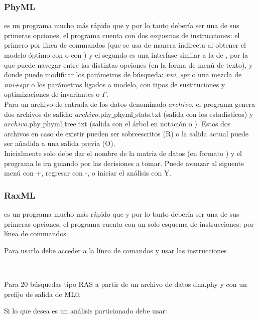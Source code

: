 \subsubsection{PhyML}
 es un programa mucho m\'as r\'apido que  y 
por lo tanto deber\'ia ser una de sus primeras opciones, el programa 
cuenta con dos esquemas de instrucciones: el primero por l\'inea de 
commandos (que se usa de manera indirecta al obtener el modelo \'optimo 
con  o con ) y el segundo es una 
interfase similar a la de , por la que puede navegar 
entre las distintas opciones (en la forma de men\'u de texto), y donde 
puede modificar los par\'ametros de b\'usqueda: \textit{nni}, \textit{spr} o una mezcla de \textit{nni+spr} o los par\'ametros ligados a modelo, con tipos de sustituciones y optimizaciones de invariantes o $\Gamma$.\\
Para un archivo de entrada de los datos denominado $archivo$, el programa genera dos archivos de salida: $archivo$.phy$\_$phyml$\_$stats.txt (salida con los  estad\'isticos) y $archivo$.phy$\_$phyml$\_$tree.txt (salida con  el \'arbol en notaci\'on  o ). Estos dos archivos en caso de existir pueden ser sobreescritos (R) o la salida actual puede ser a\~nadida a una salida previa (O).\\
Inicialmente solo debe dar el nombre de la matriz de datos (en formato ) y el programa le ira guiando por las decisiones a tomar. Puede avanzar al siguente men\'u con +, regresar con -, o iniciar el an\'alisis con Y.

\subsubsection{RaxML}
 es un programa mucho m\'as r\'apido que  y por lo tanto deber\'ia ser una de sus primeras opciones, el programa cuenta con un solo esquema de instrucciones: por l\'inea de commandos.

Para usarlo debe acceder a la l\'inea de comandos y usar las instrucciones



\\
\noindent

Para 20 b\'usquedas tipo RAS a partir de un archivo de datos dna.phy y con un prefijo de salida de ML0.

Si lo que desea es un an\'alisis particionado debe usar:


